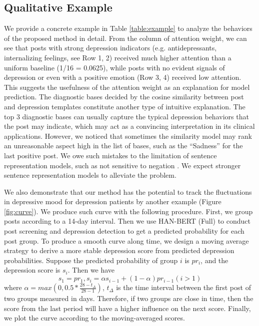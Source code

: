 \subsection{Qualitative Example}

We provide a concrete example in Table \ref{table:example} to analyze the behaviors of the proposed method in detail. From the column of attention weight, we can see that posts with strong depression indicators (e.g. antidepressants, internalizing feelings, see Row 1, 2) received much higher attention than a uniform baseline (1/16 = 0.0625), while posts with no evident signals of depression or even with a positive emotion (Row 3, 4) received low attention. This suggests the usefulness of the attention weight as an explanation for model prediction. The diagnostic bases decided by the cosine similarity between post and depression templates constitute another type of intuitive explanation. The top 3 diagnostic bases can usually capture the typical depression behaviors that the post may indicate, which may act as a convincing interpretation in its clinical applications. However, we noticed that sometimes the similarity model may rank an unreasonable aspect high in the list of bases, such as the ``Sadness'' for the last positive post. We owe such mistakes to the limitation of sentence representation models, such as not sensitive to negation \citep{ribeiro2020beyond}. We expect stronger sentence representation models to alleviate the problem.

We also demonstrate that our method has the potential to track the fluctuations in depressive mood for depression patients by another example (Figure \ref{fig:curve}). We produce such curve with the following procedure. First, we group posts according to a 14-day interval. Then we use HAN-BERT (Full) to conduct post screening and depression detection to get a predicted probability for each post group. To produce a smooth curve along time, we design a moving average strategy to derive a more stable depression score from predicted depression probabilities. Suppose the predicted probability of group $i$ is $pr_i$, and the depression score is $s_i$. Then we have 
$$s_1 = pr_1, s_i = \alpha s_{i-1} + (1-\alpha) pr_{i-1} (i > 1)$$
where $\alpha = max(0, 0.5 * \frac{28-t_{\Delta}}{28-1})$, $t_{\Delta}$ is the time interval between the first post of two groups measured in days. Therefore, if two groups are close in time, then the score from the last period will have a higher influence on the next score. Finally, we plot the curve according to the moving-averaged scores.



